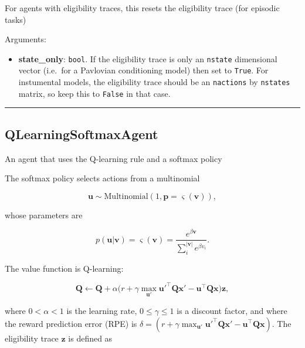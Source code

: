 For agents with eligibility traces, this resets the eligibility trace
(for episodic tasks)

Arguments:

\begin{itemize}
\tightlist
\item
  \textbf{state\_only}: \texttt{bool}. If the eligibility trace is only
  an \texttt{nstate} dimensional vector (i.e.~for a Pavlovian
  conditioning model) then set to \texttt{True}. For instumental models,
  the eligibility trace should be an \texttt{nactions} by
  \texttt{nstates} matrix, so keep this to \texttt{False} in that case.
\end{itemize}

\begin{center}\rule{0.5\linewidth}{\linethickness}\end{center}

\subsection{QLearningSoftmaxAgent}\label{qlearningsoftmaxagent}

\begin{Shaded}
\begin{Highlighting}[]
\end{Highlighting}
\end{Shaded}

An agent that uses the Q-learning rule and a softmax policy

The softmax policy selects actions from a multinomial

\[
\mathbf u \sim \mathrm{Multinomial}(1, \mathbf p=\varsigma(\mathbf v)),
\]

whose parameters are

\[
p(\mathbf u|\mathbf v) = \varsigma(\mathbf v) = \frac{e^{\beta \mathbf v}}{\sum_{i}^{|\mathbf v|} e^{\beta v_i}}.
\]

The value function is Q-learning:

\[
\mathbf Q \gets \mathbf Q + \alpha \big(r + \gamma \max_{\mathbf u'} \mathbf u'^\top \mathbf Q \mathbf x' - \mathbf u^\top \mathbf Q \mathbf x \big) \mathbf z,
\]

where \(0 < \alpha < 1\) is the learning rate, \(0 \leq \gamma \leq 1\)
is a discount factor, and where the reward prediction error (RPE) is
\(\delta = (r + \gamma \max_{\mathbf u'} \mathbf u'^\top \mathbf Q \mathbf x' - \mathbf u^\top \mathbf Q \mathbf x)\).
The eligibility trace \(\mathbf z\) is defined as

